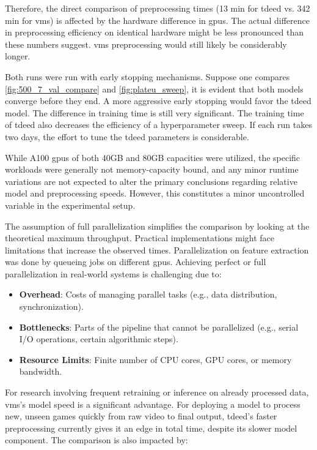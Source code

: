Therefore, the direct comparison of preprocessing times (13 min for \acrshort{tdeed} vs. 342 min for \acrshort{vms}) is affected by the hardware difference in \acrshort{gpu}s. The actual difference in preprocessing efficiency on identical hardware might be less pronounced than these numbers suggest. \acrshort{vms} preprocessing would still likely be considerably longer. 


Both runs were run with early stopping mechanisms. Suppose one compares \cref{fig:500_7_val_compare} and \cref{fig:plateu_sweep}, it is evident that both models converge before they end. A more aggressive early stopping would favor the \acrshort{tdeed} model. The difference in training time is still very significant. The training time of \acrshort{tdeed} also decreases the efficiency of a hyperparameter sweep. If each run takes two days, the effort to tune the \acrshort{tdeed} parameters is considerable. 


While A100 \acrshort{gpu}s of both 40GB and 80GB capacities were utilized, the specific workloads were generally not memory-capacity bound, and any minor runtime variations are not expected to alter the primary conclusions regarding relative model and preprocessing speeds. However, this constitutes a minor uncontrolled variable in the experimental setup. 


The assumption of full parallelization simplifies the comparison by looking at the theoretical maximum throughput. Practical implementations might face limitations that increase the observed times. Parallelization on feature extraction was done by queueing jobs on different \acrshort{gpu}s. Achieving perfect or full parallelization in real-world systems is challenging due to:
\begin{itemize}
    \item \textbf{Overhead}: Costs of managing parallel tasks (e.g., data distribution, synchronization).
    \item \textbf{Bottlenecks}: Parts of the pipeline that cannot be parallelized (e.g., serial I/O operations, certain algorithmic steps).
    \item \textbf{Resource Limits}: Finite number of CPU cores, GPU cores, or memory bandwidth.
\end{itemize}


For research involving frequent retraining or inference on already processed data, \acrshort{vms}'s model speed is a significant advantage. For deploying a model to process new, unseen games quickly from raw video to final output, \acrshort{tdeed}'s faster preprocessing currently gives it an edge in total time, despite its slower model component. The comparison is also impacted by:


